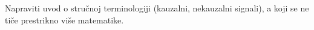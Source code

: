 Napraviti uvod o stručnoj terminologiji (kauzalni, nekauzalni signali), a koji se ne tiče prestrikno više matematike.